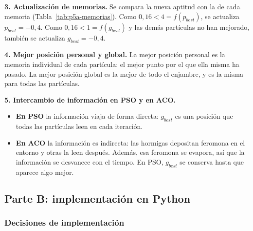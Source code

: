 \documentclass[12pt,a4paper]{article}
\begin{document}


\noindent\textbf{3. Actualización de memorias.} Se compara la nueva aptitud
con la de cada memoria (Tabla~\ref{tab:p5a-memorias}). Como $0{,}16<4=
f(p_{best})$, se actualiza $p_{best}=-0{,}4$. Como $0{,}16<1=f(g_{best})$ y
las demás partículas no han mejorado, también se actualiza $g_{best}=-0{,}4$.



\noindent\textbf{4. Mejor posición personal y global.} La mejor posición
personal es la memoria individual de cada partícula: el mejor punto por el que
ella misma ha pasado. La mejor posición global es la mejor de todo el
enjambre, y es la misma para todas las partículas.

\noindent\textbf{5. Intercambio de información en PSO y en ACO.}
\begin{itemize}
  \item \textbf{En PSO} la información viaja de forma directa: $g_{best}$ es
  una posición que todas las partículas leen en cada iteración.
  \item \textbf{En ACO} la información es indirecta: las hormigas depositan
  feromona en el entorno y otras la leen después. Además, esa feromona se
  evapora, así que la información se desvanece con el tiempo. En PSO,
  $g_{best}$ se conserva hasta que aparece algo mejor.
\end{itemize}

\subsection{Parte B: implementación en Python}

\subsubsection{Decisiones de implementación}
\end{document}
